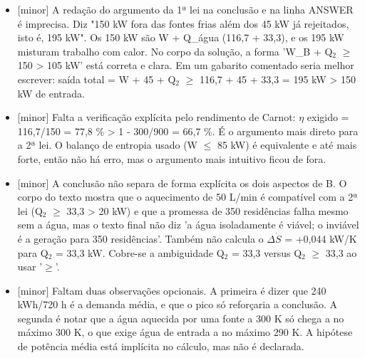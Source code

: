 \documentclass{article}%
\begin{document}
\begin{itemize}%
\item%
{[}minor{]} A redação do argumento da 1ª lei na conclusão e na linha ANSWER é imprecisa. Diz "150 kW fora das fontes frias além dos 45 kW já rejeitados, isto é, 195 kW". Os 150 kW são W + Q\_água (116,7 + 33,3), e os 195 kW misturam trabalho com calor. No corpo da solução, a forma 'W\_B + Q$_{2}$ $\geq$ 150 > 105 kW' está correta e clara. Em um gabarito comentado seria melhor escrever: saída total = W + 45 + Q$_{2}$ $\geq$ 116,7 + 45 + 33,3 = 195 kW > 150 kW de entrada.%
\item%
{[}minor{]} Falta a verificação explícita pelo rendimento de Carnot: $\eta$ exigido = 116,7/150 = 77,8 \% > 1 - 300/900 = 66,7 \%. É o argumento mais direto para a 2ª lei. O balanço de entropia usado (W $\leq$ 85 kW) é equivalente e até mais forte, então não há erro, mas o argumento mais intuitivo ficou de fora.%
\item%
{[}minor{]} A conclusão não separa de forma explícita os dois aspectos de B. O corpo do texto mostra que o aquecimento de 50 L/min é compatível com a 2ª lei (Q$_{2}$ $\geq$ 33,3 > 20 kW) e que a promessa de 350 residências falha mesmo sem a água, mas o texto final não diz 'a água isoladamente é viável; o inviável é a geração para 350 residências'. Também não calcula o $\Delta$$\dot S$ = +0,044 kW/K para Q$_{2}$ = 33,3 kW. Cobre{-}se a ambiguidade Q$_{2}$ = 33,3 versus Q$_{2}$ $\geq$ 33,3 ao usar '$\geq$'.%
\item%
{[}minor{]} Faltam duas observações opcionais. A primeira é dizer que 240 kWh/720 h é a demanda média, e que o pico só reforçaria a conclusão. A segunda é notar que a água aquecida por uma fonte a 300 K só chega a no máximo 300 K, o que exige água de entrada a no máximo 290 K. A hipótese de potência média está implícita no cálculo, mas não é declarada.%
\end{itemize}%
\end{document}
